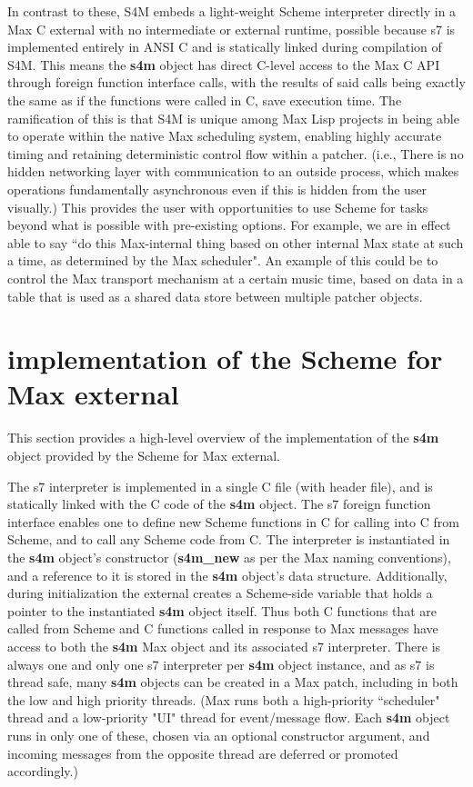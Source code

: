 \documentclass[acmsmall]{acmart}
\begin{document}
In contrast to these, S4M embeds a light-weight Scheme interpreter directly in a Max
C external with no intermediate or external runtime, possible because s7 is implemented entirely
in ANSI C and is statically linked during compilation of S4M. 
This means the \textbf{s4m} object has direct C-level access to the Max C API 
through foreign function interface calls, with the results of said calls being exactly 
the same as if the functions were called in C, save execution time. 
The ramification of this is that S4M is unique among Max Lisp projects in being
able to operate within the native Max scheduling system, enabling highly accurate
timing and retaining deterministic control flow within a patcher. (i.e., There
is no hidden networking layer with communication to an outside process, which 
makes operations fundamentally asynchronous even if this is hidden from the user visually.)
This provides the user with opportunities to use Scheme for tasks beyond
what is possible with pre-existing options. For example, we are in effect 
able to say ``do this Max-internal thing based on other internal Max state at such a time,
as determined by the Max scheduler". An example of this could be to control
the Max transport mechanism at a certain music time, based on data in a table 
that is used as a shared data store between multiple patcher objects. 


\section{implementation of the Scheme for Max external}

This section provides a high-level overview of the implementation of the \textbf{s4m} 
object provided by the Scheme for Max external.

The s7 interpreter is implemented in a single C file (with header file), 
and is statically linked with the C code of the \textbf{s4m} object. 
The s7 foreign function interface enables one to define new Scheme functions in C 
for calling into C from Scheme, and to call any Scheme code from C. 
The interpreter is instantiated
in the \textbf{s4m} object's constructor (\textbf{s4m\_new} as per the Max naming conventions), and
a reference to it is stored in the \textbf{s4m} object's data structure.
Additionally, during initialization the external creates a Scheme-side variable 
that holds a pointer to the instantiated \textbf{s4m} object itself. Thus
both C functions that are called from Scheme and C functions called in response to Max
messages have access to both the \textbf{s4m} Max object and its associated s7 interpreter.
There is always one and only one s7 interpreter per \textbf{s4m} object instance, and
as s7 is thread safe, many \textbf{s4m} objects can be created in a Max patch, including
in both the low and high priority threads. (Max runs both a high-priority ``scheduler" 
thread and a low-priority "UI" thread for event/message flow. Each \textbf{s4m} object 
runs in only one of these, chosen via an optional constructor argument, and incoming messages
from the opposite thread are deferred or promoted accordingly.)
\end{document}
